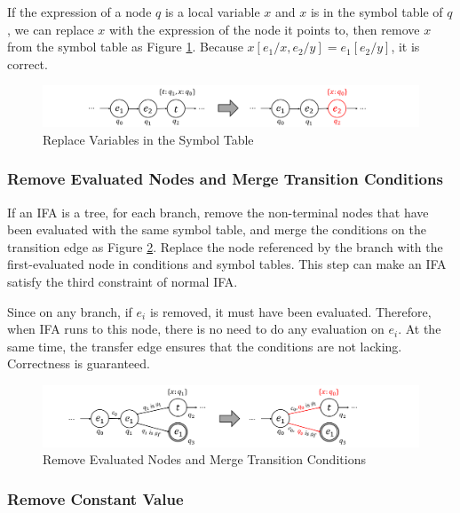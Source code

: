 If the expression of a node $q$ is a local variable $x$ and $x$ is in the symbol table of $q$, we can replace $x$ with the expression of the node it points to, then remove $x$ from the symbol table as Figure \ref{fig:nmlifa-replace}. Because $x[e_1/x, e_2/y]=e_1[e_2/y]$, it is correct.

\begin{figure}[t]
	\centering
    \includegraphics[scale=0.25]{images/nmlifa/nmlifa-replace.png}
	\caption{Replace Variables in the Symbol Table}
	\label{fig:nmlifa-replace}
\end{figure}

\subsubsection{Remove Evaluated Nodes and Merge Transition Conditions}

If an IFA is a tree, for each branch, remove the non-terminal nodes that have been evaluated with the same symbol table, and merge the conditions on the transition edge as Figure \ref{fig:nmlifa-merge}. Replace the node referenced by the branch with the first-evaluated node in conditions and symbol tables. This step can make an IFA satisfy the third constraint of normal IFA.

Since on any branch, if $e_i$ is removed, it must have been evaluated. Therefore, when IFA runs to this node, there is no need to do any evaluation on $e_i$. At the same time, the transfer edge ensures that the conditions are not lacking. Correctness is guaranteed.

\begin{figure}[t]
	\centering
	\includegraphics[scale=0.25]{images/nmlifa/nmlifa-merge.png}
	\caption{Remove Evaluated Nodes and Merge Transition Conditions}
	\label{fig:nmlifa-merge}
\end{figure}

\subsubsection{Remove Constant Value}

